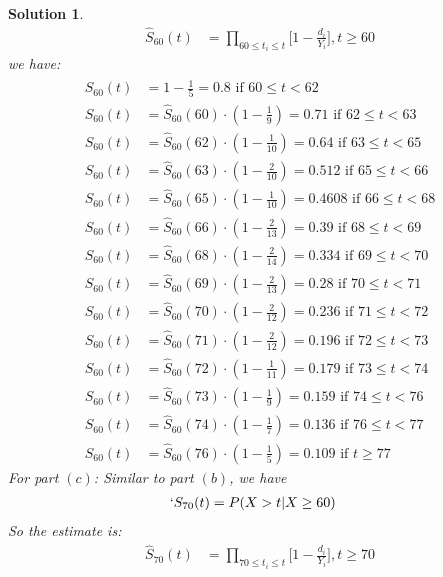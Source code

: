 \documentclass[11pt]{article}
\newtheorem{sol}{Solution}
\begin{document}
\begin{sol}
	\begin{align*}
		\hat{S}_{60}(t) &= \prod_{60 \leq t_i \leq t}\Big[1 - \frac{d_i}{Y_i}\Big], t \geq 60
	\end{align*}
	we have:
	\begin{align*}
		\hat{S}_{60}(t) &= 1 -  \frac{1}{5} = 0.8   \text{ if }60 \leq t < 62\\
		\hat{S}_{60}(t) &= \hat{S}_{60}(60)\cdot (1 - \frac{1}{9}) = 0.71 \text{ if } 62 \leq t < 63\\
		\hat{S}_{60}(t) &= \hat{S}_{60}(62)\cdot (1 - \frac{1}{10}) = 0.64 \text{ if } 63 \leq t <65\\
		\hat{S}_{60}(t)&= \hat{S}_{60}(63) \cdot (1 - \frac{2}{10}) = 0.512 \text{ if }65 \leq t < 66\\
		\hat{S}_{60}(t) &= \hat{S}_{60}(65)\cdot (1 - \frac{1}{10}) = 0.4608 \text{ if }66 \leq t < 68\\
		\hat{S}_{60}(t) &= \hat{S}_{60}(66) \cdot (1 - \frac{2}{13}) = 0.39 \text{ if }68 \leq t < 69\\
		\hat{S}_{60}(t) &= \hat{S}_{60}(68)\cdot (1 - \frac{2}{14}) = 0.334 \text{ if } 69 \leq t < 70\\
		\hat{S}_{60}(t) &= \hat{S}_{60}(69)\cdot (1 - \frac{2}{13}) = 0.28\text{ if } 70 \leq t < 71\\
		\hat{S}_{60}(t) &= \hat{S}_{60}(70)\cdot (1 - \frac{2}{12}) = 0.236 \text{ if }71 \leq t < 72\\
		\hat{S}_{60}(t) &= \hat{S}_{60}(71) \cdot (1 - \frac{2}{12}) = 0.196\text{ if }72 \leq t < 73\\
		\hat{S}_{60}(t) &= \hat{S}_{60}(72)\cdot (1 - \frac{1}{11}) = 0.179 \text{ if } 73 \leq t < 74\\
		\hat{S}_{60}(t) &= \hat{S}_{60}(73) \cdot (1 - \frac{1}{9}) = 0.159 \text{ if } 74 \leq t < 76\\
		\hat{S}_{60}(t) &= \hat{S}_{60}(74) \cdot (1 - \frac{1}{7})= 0.136 \text{ if }76 \leq t < 77\\
		\hat{S}_{60}(t) &= \hat{S}_{60}(76)\cdot  (1 - \frac{1}{5}) = 0.109 \text{ if } t\geq 77
	\end{align*}
	For part $(c)$:\vskip 2mm
	Similar to part $(b)$, we have
	\begin{align*}
	`S_{70}(t)&= P(X > t|X \geq 60)
	\end{align*}
	So the estimate is:
	\begin{align*}
		\hat{S}_{70}(t) &= \prod_{70 \leq t_i \leq t}\Big[1 - \frac{d_i}{Y_i}\Big], t \geq 70
	\end{align*}

\end{sol}
\end{document}

